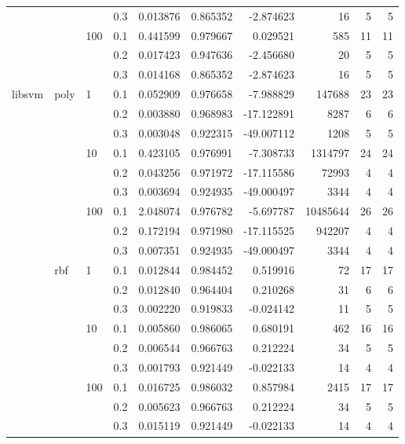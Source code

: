 \begin{table}[h!]
\begin{tabular}{llllrrrrrr}
       &     &     & 0.3 &     0.013876 &   0.865352 &  -2.874623 &        16 &           5 &         5 \\
       &     & 100 & 0.1 &     0.441599 &   0.979667 &   0.029521 &       585 &          11 &        11 \\
       &     &     & 0.2 &     0.017423 &   0.947636 &  -2.456680 &        20 &           5 &         5 \\
       &     &     & 0.3 &     0.014168 &   0.865352 &  -2.874623 &        16 &           5 &         5 \\
libsvm & poly & 1   & 0.1 &     0.052909 &   0.976658 &  -7.988829 &    147688 &          23 &        23 \\
       &     &     & 0.2 &     0.003880 &   0.968983 & -17.122891 &      8287 &           6 &         6 \\
       &     &     & 0.3 &     0.003048 &   0.922315 & -49.007112 &      1208 &           5 &         5 \\
       &     & 10  & 0.1 &     0.423105 &   0.976991 &  -7.308733 &   1314797 &          24 &        24 \\
       &     &     & 0.2 &     0.043256 &   0.971972 & -17.115586 &     72993 &           4 &         4 \\
       &     &     & 0.3 &     0.003694 &   0.924935 & -49.000497 &      3344 &           4 &         4 \\
       &     & 100 & 0.1 &     2.048074 &   0.976782 &  -5.697787 &  10485644 &          26 &        26 \\
       &     &     & 0.2 &     0.172194 &   0.971980 & -17.115525 &    942207 &           4 &         4 \\
       &     &     & 0.3 &     0.007351 &   0.924935 & -49.000497 &      3344 &           4 &         4 \\
       & rbf & 1   & 0.1 &     0.012844 &   0.984452 &   0.519916 &        72 &          17 &        17 \\
       &     &     & 0.2 &     0.012840 &   0.964404 &   0.210268 &        31 &           6 &         6 \\
       &     &     & 0.3 &     0.002220 &   0.919833 &  -0.024142 &        11 &           5 &         5 \\
       &     & 10  & 0.1 &     0.005860 &   0.986065 &   0.680191 &       462 &          16 &        16 \\
       &     &     & 0.2 &     0.006544 &   0.966763 &   0.212224 &        34 &           5 &         5 \\
       &     &     & 0.3 &     0.001793 &   0.921449 &  -0.022133 &        14 &           4 &         4 \\
       &     & 100 & 0.1 &     0.016725 &   0.986032 &   0.857984 &      2415 &          17 &        17 \\
       &     &     & 0.2 &     0.005623 &   0.966763 &   0.212224 &        34 &           5 &         5 \\
       &     &     & 0.3 &     0.015119 &   0.921449 &  -0.022133 &        14 &           4 &         4 \\
\bottomrule
\end{tabular}
\end{table}
